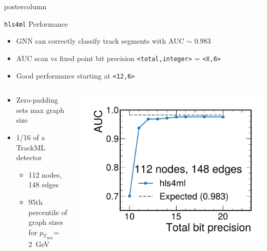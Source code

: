\documentclass[final,hyperref={pdfpagelabels=false}]{beamer}
\newcommand{\hlsfml}{{\texttt{hls4ml}}\xspace}
\newcommand{\ptmin}{\ensuremath{p_{\mathrm{T_{min}}}}\xspace}
\begin{document}
\begin{frame}
\begin{columns}
\begin{column}{.49\textwidth}
\begin{beamercolorbox}[center,wd=\textwidth]{postercolumn}
\begin{minipage}[T]{.95\textwidth}
{            \begin{block}{{\hlsfml} Performance}
              \begin{itemize}
                  \item GNN can correctly classify track segments with AUC $\sim$ 0.983 \\
                  \item AUC scan vs fixed point bit precision \texttt{<total,integer>} = \texttt{<X,6>}
                  \item Good performance starting at \texttt{<12,6>}
              \end{itemize}
              \begin{columns}
                \begin{column}{.49\textwidth}
                  \begin{itemize}
                      \item Zero-padding sets max graph size
                      \item 1/16 of a TrackML detector
                      \begin{itemize}
                          \item 112 nodes, 148 edges
                          \item 95th percentile of graph sizes for \ptmin = 2~GeV
                      \end{itemize}
                  \end{itemize}
                \end{column}
                \begin{column}{.49\textwidth}
                  \begin{center}
                      \includegraphics[width=0.673\linewidth]{figures/AUC_vs_BP.pdf}
                  \end{center}
                \end{column}
              \end{columns}
            \end{block}
              
}
\end{minipage}
\end{beamercolorbox}
\end{column}
\end{columns}
\end{frame}
\end{document}
